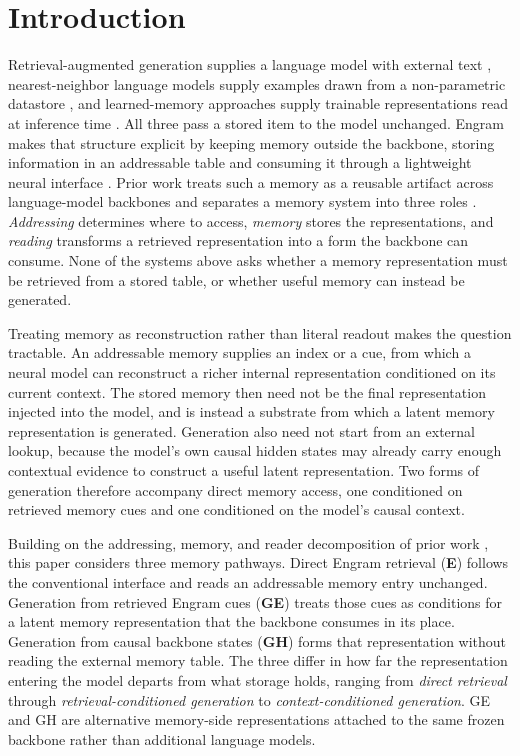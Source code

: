 \documentclass{article}
\begin{document}
\section{Introduction}

Retrieval-augmented generation supplies a language model with external text
\citep{lewis2020rag}, nearest-neighbor language models supply examples drawn
from a non-parametric datastore \citep{khandelwal2020knn}, and learned-memory
approaches supply trainable representations read at inference time
\citep{wei2025mlp,cheng2026engram}.
All three pass a stored item to the model unchanged.
Engram makes that structure explicit by keeping memory outside the backbone,
storing information in an addressable table and consuming it through a
lightweight neural interface \citep{cheng2026engram}.
Prior work treats such a memory as a reusable artifact across language-model
backbones and separates a memory system into three roles
\citep{li2026transfer}.
\emph{Addressing} determines where to access, \emph{memory} stores the
representations, and \emph{reading} transforms a retrieved representation into
a form the backbone can consume.
None of the systems above asks whether a memory representation must be
retrieved from a stored table, or whether useful memory can instead be
generated.

Treating memory as reconstruction rather than literal readout makes the
question tractable. An addressable memory supplies an index or a cue, from
which a neural model can reconstruct a richer internal representation
conditioned on its current context.
The stored memory then need not be the final representation injected into the
model, and is instead a substrate from which a latent memory representation is
generated.
Generation also need not start from an external lookup, because the model's
own causal hidden states may already carry enough contextual evidence to
construct a useful latent representation.
Two forms of generation therefore accompany direct memory access, one
conditioned on retrieved memory cues and one conditioned on the model's causal
context.

Building on the addressing, memory, and reader decomposition of prior work
\citep{li2026transfer}, this paper considers three memory pathways.
Direct Engram retrieval (\textbf{E}) follows the conventional interface and
reads an addressable memory entry unchanged.
Generation from retrieved Engram cues (\textbf{GE}) treats those cues as
conditions for a latent memory representation that the backbone consumes in
its place.
Generation from causal backbone states (\textbf{GH}) forms that representation
without reading the external memory table.
The three differ in how far the representation entering the model departs from
what storage holds, ranging from \emph{direct retrieval} through
\emph{retrieval-conditioned generation} to \emph{context-conditioned
generation}.
GE and GH are alternative memory-side representations attached to the same
frozen backbone rather than additional language models.
\end{document}
